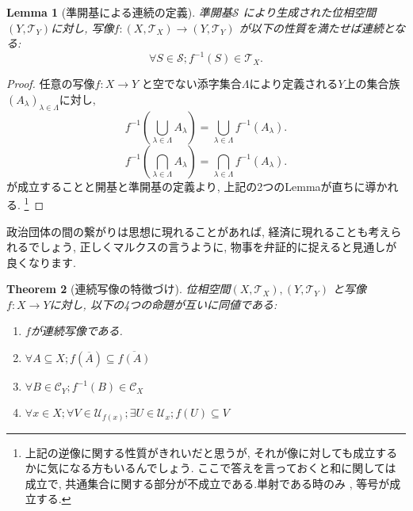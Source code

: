 \documentclass[dvipdfmx]{jbook}
\newcommand{\cl}[1]{\overline{ #1}  }
\newtheorem{theorem}{Theorem}[section]
\newtheorem{lemma}[theorem]{Lemma}
\theoremstyle{remark}
\theoremstyle{plain}
\begin{document}
\begin{lemma}[準開基による連続の定義]
	準開基$\mathcal{S}$ により生成された位相空間$\left( Y, \mathcal{T}_Y \right) $に対し, 写像$f: \left( X , \mathcal{T}_X \right) \to \left( Y, \mathcal{T}_Y \right) $ が以下の性質を満たせば連続となる:
\[
\forall S \in \mathcal{S}; f^{-1}\left( S \right) \in \mathcal{T}_X
.\] 

\end{lemma}

\begin{proof}
	任意の写像$f: X \to Y$ と空でない添字集合$\Lambda$により定義される$Y$上の集合族 $\left( A_{\lambda} \right) _{\lambda \in \Lambda}$に対し,
	\[
	f^{-1}\left( \bigcup_{\lambda \in \Lambda} A_{\lambda}  \right) = \bigcup_{\lambda \in \Lambda} f^{-1}\left( A_\lambda \right) 
	.\] 
	\[
	f^{-1}\left( \bigcap_{\lambda \in \Lambda} A_{\lambda}  \right) = \bigcap_{\lambda \in \Lambda} f^{-1}\left( A_\lambda \right) 
	.\]
	が成立することと開基と準開基の定義より, 上記の2つのLemmaが直ちに導かれる. 
	\footnote{上記の逆像に関する性質がきれいだと思うが, それが像に対しても成立するかに気になる方もいるんでしょう. 
	ここで答えを言っておくと和に関しては成立で, 共通集合に関する部分が{\color{red}不成立}である.単射である時のみ , 等号が成立する.}
\end{proof}

政治団体の間の繋がりは思想に現れることがあれば, 経済に現れることも考えられるでしょう, 正しくマルクスの言うように, 物事を弁証的に捉えると見通しが良くなります.

\begin{theorem}[連続写像の特徴づけ]
	位相空間$\left( X,\mathcal{T}_X \right) ,\left( Y,\mathcal{T}_Y \right) $ と写像$f:X \to Y$に対し, 以下の4つの命題が互いに同値である:
	\begin{enumerate}
		\item $f$が連続写像である.
		\item  $\forall A \subseteq X ; f\left( \cl{A} \right) \subseteq \cl{f\left( A \right) }$ 
		\item $\forall B \in \mathcal{C}_Y; f^{-1}\left( B \right)  \in \mathcal{C}_X$ 
		\item $\forall x \in X; \forall V \in \mathcal{U}_{f(x)};\exists U \in \mathcal{U}_x; f(U) \subseteq V $
	\end{enumerate}
\end{theorem}
\end{document}
